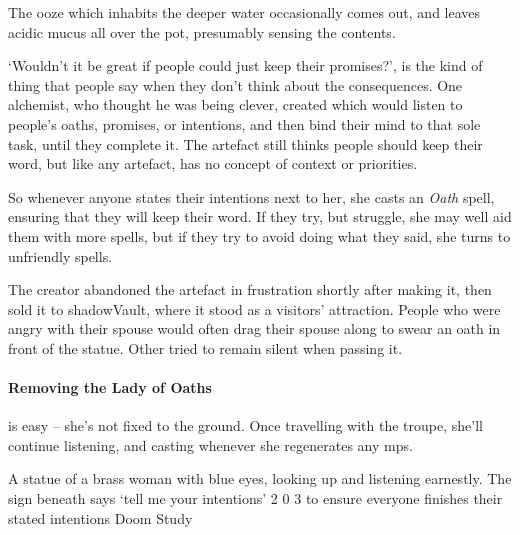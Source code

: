 \begin{multicols}{2}
The ooze which inhabits the deeper water  occasionally comes out, and leaves acidic mucus all over the pot, presumably sensing the contents.

\jelly[1]


\begin{exampletext}
  `Wouldn't it be great if people could just keep their promises?', is the kind of thing that people say when they don't think about the consequences.
  One alchemist, who thought he was being clever, created  which would listen to people's oaths, promises, or intentions, and then bind their mind to that sole task, until they complete it.
  The \gls{artefact} still thinks people should keep their word, but like any \gls{artefact}, has no concept of context or priorities.

  So whenever anyone states their intentions next to her, she casts an \textit{Oath} spell, ensuring that they will keep their word.
  If they try, but struggle, she may well aid them with more spells, but if they try to avoid doing what they said, she turns to unfriendly spells.

  The creator abandoned the \gls{artefact} in frustration shortly after making it, then sold it to \gls{shadowVault}, where it stood as a visitors' attraction.
  People who were angry with their spouse would often drag their spouse along to swear an oath in front of the statue.
  Other tried to remain silent when passing it.
\end{exampletext}


\paragraph{Removing the Lady of Oaths}
is easy -- she's not fixed to the ground.
Once travelling with the troupe, she'll continue listening, and casting whenever she regenerates any \glspl{mp}.

  {A statue of a brass woman with blue eyes, looking up and listening earnestly.
  The sign beneath says `tell me your intentions'}%
  {2}%
  {0}%
  {3}%
  {to ensure everyone finishes their stated intentions}%
  {Doom Study}%
  {
    \setcounter{Fate}{2}
    \setcounter{Water}{2}
    \setcounter{Empathy}{2}
    \setcounter{Cultivation}{1}
  }%


\end{multicols}
